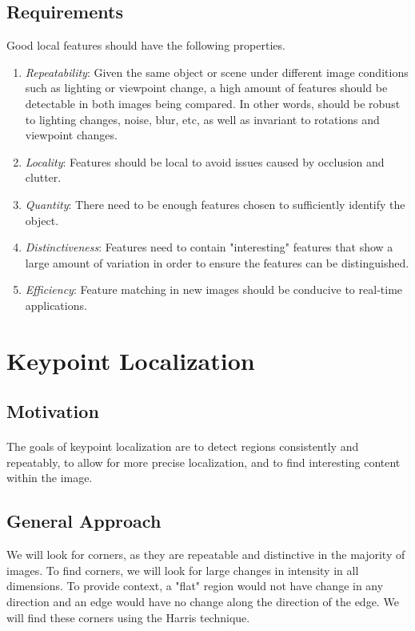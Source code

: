\documentclass{article}
\begin{document}
\subsection{Requirements}
Good local features should have the following properties.
\begin{enumerate}
\item \textit{Repeatability}: Given the same object or scene under different image conditions such as lighting or viewpoint change, a high amount of features should be detectable in both images being compared. In other words, should be robust to lighting changes, noise, blur, etc, as well as invariant to rotations and viewpoint changes.
\item \textit{Locality}: Features should be local to avoid issues caused by occlusion and clutter.
\item \textit{Quantity}: There need to be enough features chosen to sufficiently identify the object.
\item \textit{Distinctiveness}: Features need to contain "interesting" features that show a large amount of variation in order to ensure the features can be distinguished.
\item \textit{Efficiency}: Feature matching in new images should be conducive to  real-time applications. 
\end{enumerate}

\section{Keypoint Localization}
\subsection{Motivation}
\paragraph{} The goals of keypoint localization are to detect regions consistently and repeatably, to allow for more precise localization, and to find interesting content within the image. 

\subsection{General Approach}
We will look for corners, as they are repeatable and distinctive in the majority of images. To find corners, we will look for large changes in intensity in all dimensions. To provide context, a "flat" region would not have change in any direction and an edge would have no change along the direction of the edge. We will find these corners using the Harris technique.
\end{document}
